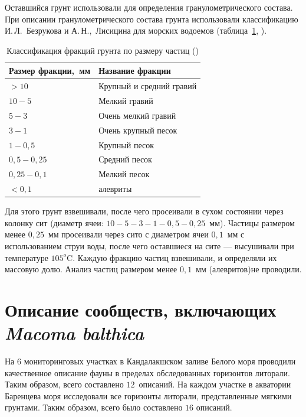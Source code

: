 Оставшийся грунт использовали для определения гранулометрического состава. 
При описании гранулометрического состава грунта использовали классификацию И.\,Л.~Безрукова и А.\,Н.,~Лисицина для морских водоемов (таблица~\ref{tab:lisicyn_granulometriya}, \cite{Bezrukov_Lisicyn_1960}).
\begin{table}[p]
    \centering
    \caption{Классификация фракций грунта по размеру частиц (\cite{Bezrukov_Lisicyn_1960})}
    \label{tab:lisicyn_granulometriya}
\begin{tabular}{|l|l|}
    \hline
    Размер фракции,~мм & Название фракции         \\ \hline
     $> 10$    & Крупный и средний гравий  \\
    $10-5$               & Мелкий гравий         \\
    $5-3$                & Очень мелкий гравий   \\
    $3-1$                & Очень крупный песок   \\
    $1-0,5$              & Крупный песок         \\
    $0,5-0,25$           & Средний песок         \\
    $0,25-0,1$           & Мелкий песок          \\
    $< 0,1$           & алевриты       \\\hline
\end{tabular}
\end{table}
Для этого грунт взвешивали, после чего просеивали в сухом состоянии через колонку сит (диаметр ячеи: $10 - 5 - 3 - 1 - 0,5 - 0,25$~мм). 
Частицы размером менее $0,25$~мм просеивали через сито с диаметром ячеи $0,1$~мм с использованием струи воды, после чего оставшиеся на сите --- высушивали при температуре $105^o$C. 
Каждую фракцию частиц взвешивали, и определяли их массовую долю. 
Анализ частиц размером менее $0,1$~мм (алевритов)не проводили. 

\afterpage{\clearpage}

    \section{Описание сообществ, включающих {\it Macoma balthica}}
На 6 мониторинговых участках в Кандалакшском заливе Белого моря проводили качественное описание фауны в пределах обследованных горизонтов литорали.
Таким образом, всего составлено $12$~описаний.
На каждом участке в акватории Баренцева моря исследовали все  горизонты литорали, представленные мягкими грунтами.  
Таким образом, всего было составлено $16$ описаний.

